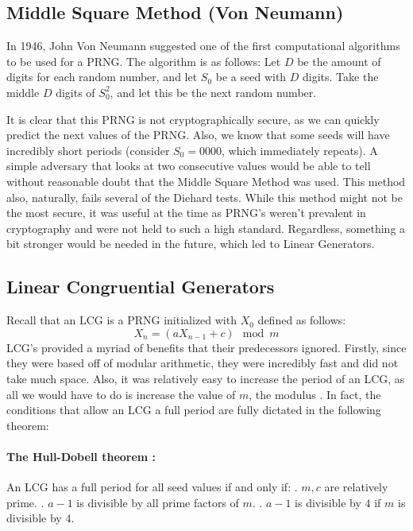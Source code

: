 \documentclass[11pt]{article}
\begin{document}
\subsection{Middle Square Method (Von Neumann)}
In 1946, John Von Neumann suggested one of the first computational algorithms to be used for a PRNG. The algorithm is as follows: \newline
Let $D$ be the amount of digits for each random number, and let $S_0$ be a seed with $D$ digits. Take the middle $D$ digits of $S_0^2$, and let this be the next random number.

It is clear that this PRNG is not cryptographically secure, as we can quickly predict the next values of the PRNG. Also, we know that some seeds will have incredibly short periods (consider $S_0 = 0000$, which immediately repeats). A simple adversary that looks at two consecutive values would be able to tell without reasonable doubt that the Middle Square Method was used. This method also, naturally, fails several of the Diehard tests. While this method might not be the most secure, it was useful at the time as PRNG's weren't prevalent in cryptography and were not held to such a high standard. Regardless, something a bit stronger would be needed in the future, which led to Linear Generators.
\subsection{Linear Congruential Generators}
Recall that an LCG is a PRNG initialized with $X_0$ defined as follows: $$X_n = (aX_{n-1} + c) \mod m$$ LCG's provided a myriad of benefits that their predecessors ignored. Firstly, since they were based off of modular arithmetic, they were incredibly fast and did not take much space. Also, it was relatively easy to increase the period of an LCG, as all we would have to do is increase the value of $m$, the modulus \cite{Well}. In fact, the conditions that allow an LCG a full period are fully dictated in the following theorem: 
\paragraph{The Hull-Dobell theorem \cite{HD}:} 
An LCG has a full period for all seed values if and only if: 
. $m, c$ are relatively prime. . $a - 1$ is divisible by all prime factors of $m$. . $a - 1$ is divisible by $4$ if $m$ is divisible by $4$. 
\end{document}
